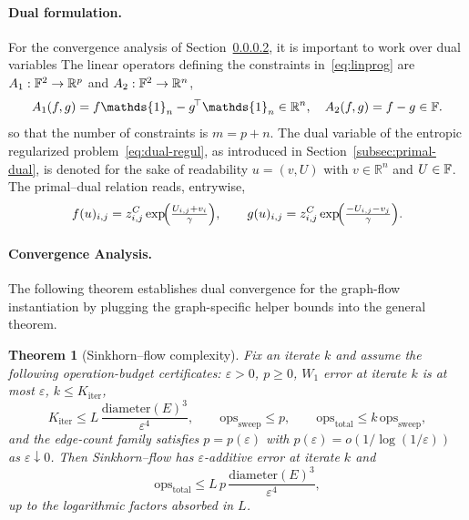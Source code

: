\documentclass{article}
\theoremstyle{plain}
\newtheorem{theorem}{Theorem}[section]
\newcommand{\ones}{\mathds{1}}
\newcommand{\Edge}{E}
\newcommand{\RR}{\mathbb{R}}
\newcommand{\z}{z}
\newcommand{\zC}{\z^C}
\begin{document}
\paragraph{Dual formulation.}

For the convergence analysis of Section~\ref{sec:conv-analysis-flow}, it is important to work over dual variables 
%
The linear operators defining the constraints in~\eqref{eq:linprog} are $A_{1}: \Flows^2 \to\RR^{p}$ and $A_{2}: \Flows^2 \to \RR^{n}$, 
\[
	A_{1}(f,g) = f\ones_{n}-g^{\!\top}\ones_{n}\in\RR^{n}, 
	\quad
	A_{2}(f,g) = f-g\in\Flows.
\]
so that the number of constraints is $m=p+n$.
%
The dual variable of the entropic regularized problem~\eqref{eq:dual-regul}, as introduced in Section~\ref{subsec:primal-dual}, is denoted for the sake of readability $u=(v,U)$ with $v\in\RR^{n}$ and $U \in\mathbb{F}$. The primal--dual relation reads, entrywise,
\[
  f(u)_{i,j}=\zC_{i,j}\exp\!\Bigl(\tfrac{U_{i,j}+v_{i}}{\gamma}\Bigr),
  \qquad
  g(u)_{i,j}=\zC_{i,j}\exp\!\Bigl(\tfrac{-U_{i,j}-v_{j}}{\gamma}\Bigr).
\]
\fi 



\paragraph{Convergence Analysis.}
\label{sec:conv-analysis-flow}

The following theorem establishes dual convergence for the graph-flow instantiation by plugging the graph-specific helper bounds into the general theorem.

\begin{theorem}[Sinkhorn--flow complexity]\label{thm:graphw1-complexity}
Fix an iterate $k$ and assume the following operation-budget certificates:
$\varepsilon>0$, $p\ge0$, $W_1$ error at iterate $k$ is at most $\varepsilon$,
$k\le K_{\mathrm{iter}}$,
\[
  K_{\mathrm{iter}}
  \le
  L\,\frac{\mathrm{diameter}(\Edge)^3}{\varepsilon^4},
  \qquad
  \mathrm{ops}_{\mathrm{sweep}}\le p,
  \qquad
  \mathrm{ops}_{\mathrm{total}}\le k\,\mathrm{ops}_{\mathrm{sweep}},
\]
and the edge-count family satisfies $p=p(\varepsilon)$ with
$p(\varepsilon)=o(1/\log(1/\varepsilon))$ as $\varepsilon\downarrow0$.
Then Sinkhorn--flow has $\varepsilon$-additive error at iterate $k$ and
\[
  \mathrm{ops}_{\mathrm{total}}
  \le
  L\,p\,\frac{\mathrm{diameter}(\Edge)^3}{\varepsilon^4},
\]
up to the logarithmic factors absorbed in $L$.
\end{theorem}
\end{document}
